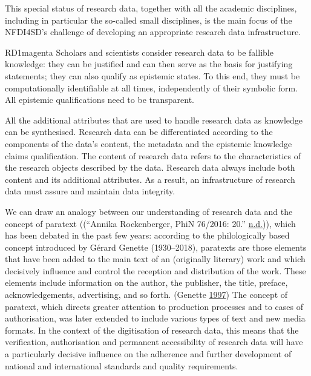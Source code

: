 \documentclass[
  english,
  paper=a4,
  oneside,captions=tableheading
]{scrbook}
\begin{document}
This special status of research data, together with all the academic
disciplines, including in particular the so-called small disciplines, is
the main focus of the NFDI4SD's challenge of developing an appropriate
research data infrastructure.

\begin{awesomeblock}[magenta]{1pt}{RD1}{magenta} Scholars and scientists consider research data to be fallible knowledge: they can be justified and can then serve as the basis for justifying statements; they can also qualify as epistemic states. To this end, they must be computationally identifiable at all times, independently of their symbolic form. All epistemic qualifications need to be transparent.\end{awesomeblock}

All the additional attributes that are used to handle research data as
knowledge can be synthesised. Research data can be differentiated
according to the components of the data's content, the metadata and the
epistemic knowledge claims qualification. The content of research data
refers to the characteristics of the research objects described by the
data. Research data always include both content and its additional
attributes. As a result, an infrastructure of research data must assure
and maintain data integrity.

We can draw an analogy between our understanding of research data and
the concept of paratext ((``Annika Rockenberger, PhiN 76/2016: 20.''
\protect\hyperlink{ref-zotero-40395}{n.d.})), which has been debated in
the past few years: according to the philologically based concept
introduced by Gérard Genette (1930--2018), paratexts are those elements
that have been added to the main text of an (originally literary) work
and which decisively influence and control the reception and
distribution of the work. These elements include information on the
author, the publisher, the title, preface, acknowledgements,
advertising, and so forth. (Genette
\protect\hyperlink{ref-genette1997}{1997}) The concept of paratext,
which directs greater attention to production processes and to cases of
authorisation, was later extended to include various types of text and
new media formats. In the context of the digitisation of research data,
this means that the verification, authorisation and permanent
accessibility of research data will have a particularly decisive
influence on the adherence and further development of national and
international standards and quality requirements.
\end{document}
